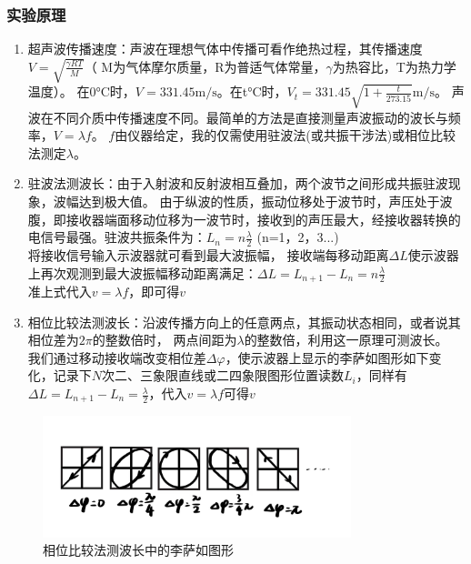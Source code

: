 \documentclass{../template/Preport}
\begin{document}
\subsubsection{实验原理}
\begin{enumerate}
    \item 超声波传播速度：声波在理想气体中传播可看作绝热过程，其传播速度$V=\sqrt{\frac{\gamma RT}{M}}$（
    M为气体摩尔质量，R为普适气体常量，$\gamma$为热容比，T为热力学温度）。
    在0$\si{\degreeCelsius}$时，$V=331.45\si{\metre\per\second}$。在t$\si{\degreeCelsius}$时，$V_t = 331.45\sqrt{1+\frac{t}{273.15}}\si{\metre\per\second}$。
    声波在不同介质中传播速度不同。最简单的方法是直接测量声波振动的波长与频率，$V=\lambda f$。
    $f$由仪器给定，我的仅需使用驻波法(或共振干涉法)或相位比较法测定$\lambda$。
    \item 驻波法测波长：由于入射波和反射波相互叠加，两个波节之间形成共振驻波现象，波幅达到极大值。
    由于纵波的性质，振动位移处于波节时，声压处于波腹，即接收器端面移动位移为一波节时，接收到的声压最大，经接收器转换的电信号最强。驻波共振条件为：$L_n = n\frac{\lambda}{2}$ (n=1，2，3...)\\
    将接收信号输入示波器就可看到最大波振幅，
    接收端每移动距离$\Delta L$使示波器上再次观测到最大波振幅移动距离满足：$\Delta L = L_{n+1} - L_n = n\frac{\lambda}{2}$\\
    准上式代入$v=\lambda f$，即可得$v$
    \item 相位比较法测波长：沿波传播方向上的任意两点，其振动状态相同，或者说其相位差为$2\pi$的整数倍时，
    两点间距为$\lambda$的整数倍，利用这一原理可测波长。
    我们通过移动接收端改变相位差$\Delta\varphi$，使示波器上显示的李萨如图形如下变化，记录下$N$次二、三象限直线或二四象限图形位置读数$L_i$，同样有$\Delta L = L_{n+1} - L_n = \frac{\lambda}{2}$，代入$v=\lambda f$可得$v$
\end{enumerate}
\begin{figure}[H]
    \centering
    \includegraphics[width=0.8\textwidth]{figures/1.jpg}
    \caption{相位比较法测波长中的李萨如图形}
\end{figure}
\end{document}
